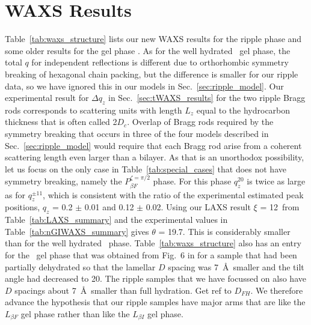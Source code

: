\section{WAXS Results}\label{sec:waxs_results}
Table~\ref{tab:waxs_structure} lists our new WAXS results for the ripple phase 
and some older results for the gel phase \cite{Tristram-Nagle02}. As for the 
well hydrated \LbetaI\ gel phase, the total $q$ for independent 
reflections is different due to orthorhombic symmetry breaking of hexagonal 
chain packing, but the difference is smaller for our ripple data, so we have 
ignored this in our models in Sec.~\ref{sec:ripple_model}.  
Our experimental result for ${\Delta}q_z$ in Sec.~\ref{sec:tWAXS_results} for the two ripple Bragg 
rods corresponds to scattering units with length $L_z$ equal to the hydrocarbon 
thickness that is often called 2$D_c$. Overlap of Bragg rods required by the 
symmetry breaking that occurs in three of the four models described 
in Sec.~\ref{sec:ripple_model} would require that each Bragg rod arise from a coherent scattering 
length even larger than a bilayer. As that is an unorthodox possibility, let 
us focus on the only case in Table~\ref{tab:special_cases} that does not have 
symmetry breaking, namely the $P_{\beta F}^{\zeta=\pi/2}$ phase. For this 
phase $q_z^{20}$ is twice as large as for $q_z^{{\pm}11}$,
which is consistent with the ratio of the experimental estimated peak 
positions, $q_z$ = 0.2 $\pm$ 0.01 and 0.12 $\pm$ 0.02. 
Using our LAXS result $\xi$ = 12\textdegree\ from Table~\ref{tab:LAXS_summary} 
and the experimental values in Table~\ref{tab:nGIWAXS_summary} gives 
$\theta$ = 19.7\textdegree. This is considerably smaller than for the well 
hydrated \LbetaI\ phase. Table~\ref{tab:waxs_structure} also has an entry 
for the \LbetaF\ gel phase that was obtained from Fig.~6 in \cite{Tristram-Nagle02} for a 
sample that had been partially dehydrated so that the lamellar $D$ spacing was 
7~\AA\ smaller and the tilt angle had decreased to 20\textdegree. The ripple 
samples that we have focussed on also have $D$ spacings about 7~\AA\ smaller 
than full hydration. {\jn Get ref to $D_{FH}$.} We therefore advance the 
hypothesis that our ripple samples have major arms that are like the 
$L_{\beta F}$ gel phase rather than like the $L_{\beta I}$ gel phase.

